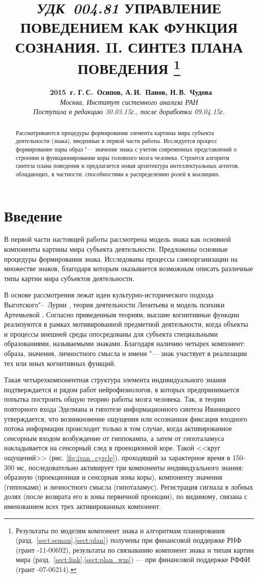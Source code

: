 \documentclass[a4paper, 12pt]{article}
\title{
	\hbox{\normalsize\textit{УДК 004.81}}
	\hbox{}\textbf{\Large\MakeUppercase{Управление поведением как функция сознания. II. Синтез плана поведения}}
	\footnote{Результаты по моделям компонент знака и алгоритмам планирования (разд.~\ref{sect:seman},\ref{sect:plan}) получены при финансовой поддержке РНФ (грант \textnumero 14-11-00692), результаты по связыванию компонент знака и типам картин мира (разд.~\ref{sect:link},\ref{sect:plan_wm}) --- при финансовой поддержке РФФИ (грант \textnumero 15-07-06214).}
}
\author{
	\textbf{\textcopyright~2015~г. Г.\,С.~Осипов, А.\,И.~Панов, Н.\,В.~Чудова}\\
	\normalsize\textit{Москва, Институт системного анализа РАН}\\
	\normalsize\textit{Поступила в редакцию 30.03.15г., после доработки 09.04.15г.}
}
\date{}
\numberwithin{equation}{section}
\begin{document}
	\vspace*{-5\baselineskip}			%
	{\let\newpage\relax\maketitle}
	\vspace*{0.2\baselineskip}
	\begin{abstract}
		\noindent Рассматриваются процедуры формирования элемента картины мира субъекта деятельности (знака), введенные в первой части работы. Исследуется процесс формирование пары образ "--- значение знака с учетом современных представлений о строении и функционировании коры головного мозга человека. Строится алгоритм синтеза плана поведения и предлагается новая архитектура интеллектуальных агентов, обладающих, в частности, способностями к распределению ролей в коалициях.
	\end{abstract}	
	
	\section*{\indent Введение}
	В первой части настоящей работы \cite{PanovA2014a} рассмотрена модель знака как основной компоненты картины мира субъекта деятельности. Предложены основные процедуры формирования знака. Исследованы процессы самоорганизации на множестве знаков, благодаря которым оказывается возможным описать различные типы картин мира субъектов деятельности.
	
	В основе рассмотрения лежат идеи культурно-исторического подхода Выготского"--~Лурии \cite{Luria1970,Vygotsky2005}, теория деятельности Леонтьева \cite{Leontiev1975} и модель психики Артемьевой \cite{Artemyeva1980}. Согласно приведенным теориям, высшие когнитивные функции реализуются в рамках мотивированной предметной деятельности, когда объекты и процессы внешней  среды опосредованы для субъекта специальными образованиями, называемыми знаками. Благодаря наличию четырех компонент: образа, значения, личностного смысла и имени "--- знак участвует в реализации тех или иных когнитивных функций. 
	
	Такая четырехкомпонентная структура элемента индивидуального знания подтверждается и рядом работ нейрофизиологов, в которых предпринимается попытка построить общую теорию работы мозга человека. Так, в теории повторного входа Эделмана \cite{Edelmen1981} и гипотезе информационного синтеза Иваницкого \cite{Ivanitsky1996,Ivanitsky2010} утверждается, что возникновение ощущения или осознанная фиксация входного потока информации происходит только в том случае, когда активированное сенсорным входом возбуждение от гиппокампа, а затем от гипоталамуса накладывается на сенсорный след в проекционной коре. Такой <<круг ощущений>> \cite{Aleksandrov2007} (рис. \ref{fig:ivan_cyrcle}), проходящий за характерное время в 150-300 мс, последовательно активирует три компоненты индивидуального знания: образную (проекционная и сенсорная зоны коры), компоненту значения (гиппокамп) и личностного смысла (гипоталамус). Регистрация сигнала в лобных долях (после возврата его в зоны первичной проекции), по видимому, связана с именованием всех трех активированных компонент.
	
\end{document}
